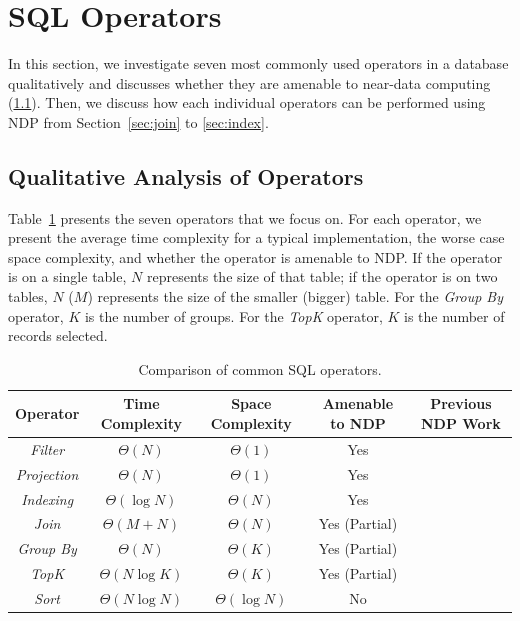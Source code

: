 \documentclass{article}
\newcommand{\filter}{\textit{Filter}\xspace}
\newcommand{\projection}{\textit{Projection}\xspace}
\newcommand{\join}{\textit{Join}\xspace}
\newcommand{\sort}{\textit{Sort}\xspace}
\newcommand{\indexing}{\textit{Indexing}\xspace}
\newcommand{\groupby}{\textit{Group By}\xspace}
\newcommand{\topk}{\textit{TopK}\xspace}
\begin{document}
\section{SQL Operators}

In this section, we investigate seven most commonly used operators in a database qualitatively and discusses whether they are amenable to near-data computing (\cref{sec:analysis}). Then, we discuss how each individual operators can be performed using NDP from Section~\ref{sec:join} to \ref{sec:index}.

\subsection{Qualitative Analysis of Operators} \label{sec:analysis}

Table~\ref{tab:operators} presents the seven operators that we focus on. For each operator, we present the average time complexity for a typical implementation, the worse case space complexity, and whether the operator is amenable to NDP.
If the operator is on a single table, $N$ represents the size of that table; if the operator is on two tables, $N$ ($M$) represents the size of the smaller (bigger) table. 
For the \textit{Group By} operator, $K$ is the number of groups. For the \textit{TopK} operator, $K$ is the number of records selected. 

\begin{table}
\centering 
\begin{tabular}{ |c|c|c|c|c| } 
 \hline
 Operator       & Time Complexity & Space Complexity  & Amenable to NDP & Previous NDP Work \\ \hline
 \filter        & $\Theta(N)$     & $\Theta(1)$       & Yes             & \cite{netezza,exadata,biscuit,sukhwani2012database,do2013query} \\ \hline
 \projection    & $\Theta(N)$     & $\Theta(1)$       & Yes             & \cite{netezza, exadata} \\\hline
 \indexing      & $\Theta(\log{N})$ & $\Theta(N)$     & Yes             & \\ \hline
 \join          & $\Theta(M + N)$ & $\Theta(N)$       & Yes (Partial)   & \cite{exadata} \\ \hline
 \groupby       & $\Theta(N)$     & $\Theta(K)$       & Yes (Partial)   & \cite{ibex, jafar} \\ \hline
 \topk          & $\Theta(N\log{K})$ & $\Theta(K)$    & Yes (Partial)   & \\ \hline
 \sort          & $\Theta(N\log{N})$ & $\Theta(\log{N})$ & No           & \\ \hline
\end{tabular}
\caption{Comparison of common SQL operators.}
\label{tab:operators}
\end{table}
\end{document}
